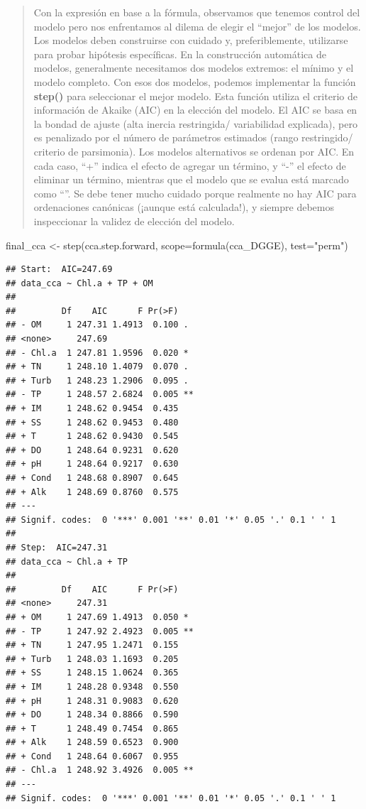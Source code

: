 \documentclass[
]{book}
\newenvironment{Shaded}{\begin{snugshade}}{\end{snugshade}}
\newcommand{\AttributeTok}[1]{\textcolor[rgb]{0.77,0.63,0.00}{#1}}
\newcommand{\FunctionTok}[1]{\textcolor[rgb]{0.00,0.00,0.00}{#1}}
\newcommand{\NormalTok}[1]{#1}
\newcommand{\OtherTok}[1]{\textcolor[rgb]{0.56,0.35,0.01}{#1}}
\newcommand{\StringTok}[1]{\textcolor[rgb]{0.31,0.60,0.02}{#1}}
\begin{document}
\begin{quote}
Con la expresión en base a la fórmula, observamos que tenemos control del modelo pero nos enfrentamos al dilema de elegir el ``mejor'' de los modelos.
Los modelos deben construirse con cuidado y, preferiblemente, utilizarse para probar
hipótesis específicas. En la construcción automática de modelos, generalmente necesitamos dos modelos extremos: el mínimo y el modelo completo. Con esos dos modelos, podemos implementar la función \textbf{step()} para seleccionar el mejor modelo. Esta función utiliza el criterio de información de Akaike (AIC) en la elección del modelo. El AIC se basa en la bondad de ajuste (alta inercia restringida/ variabilidad explicada), pero es penalizado por el número de parámetros estimados (rango restringido/ criterio de parsimonia). Los modelos alternativos se ordenan por AIC. En cada caso, ``+'' indica el efecto de agregar un término, y ``-'' el efecto de eliminar un término, mientras que el modelo que se evalua está marcado como ``''. Se debe tener mucho cuidado porque realmente no hay AIC para ordenaciones canónicas (¡aunque está calculada!), y siempre debemos inspeccionar la validez de elección del modelo.
\end{quote}

\begin{Shaded}
\begin{Highlighting}[]
\NormalTok{final\_cca }\OtherTok{\textless{}{-}} \FunctionTok{step}\NormalTok{(cca.step.forward, }\AttributeTok{scope=}\FunctionTok{formula}\NormalTok{(cca\_DGGE), }\AttributeTok{test=}\StringTok{"perm"}\NormalTok{)}
\end{Highlighting}
\end{Shaded}

\begin{verbatim}
## Start:  AIC=247.69
## data_cca ~ Chl.a + TP + OM
## 
##         Df    AIC      F Pr(>F)   
## - OM     1 247.31 1.4913  0.100 . 
## <none>     247.69                 
## - Chl.a  1 247.81 1.9596  0.020 * 
## + TN     1 248.10 1.4079  0.070 . 
## + Turb   1 248.23 1.2906  0.095 . 
## - TP     1 248.57 2.6824  0.005 **
## + IM     1 248.62 0.9454  0.435   
## + SS     1 248.62 0.9453  0.480   
## + T      1 248.62 0.9430  0.545   
## + DO     1 248.64 0.9231  0.620   
## + pH     1 248.64 0.9217  0.630   
## + Cond   1 248.68 0.8907  0.645   
## + Alk    1 248.69 0.8760  0.575   
## ---
## Signif. codes:  0 '***' 0.001 '**' 0.01 '*' 0.05 '.' 0.1 ' ' 1
## 
## Step:  AIC=247.31
## data_cca ~ Chl.a + TP
## 
##         Df    AIC      F Pr(>F)   
## <none>     247.31                 
## + OM     1 247.69 1.4913  0.050 * 
## - TP     1 247.92 2.4923  0.005 **
## + TN     1 247.95 1.2471  0.155   
## + Turb   1 248.03 1.1693  0.205   
## + SS     1 248.15 1.0624  0.365   
## + IM     1 248.28 0.9348  0.550   
## + pH     1 248.31 0.9083  0.620   
## + DO     1 248.34 0.8866  0.590   
## + T      1 248.49 0.7454  0.865   
## + Alk    1 248.59 0.6523  0.900   
## + Cond   1 248.64 0.6067  0.955   
## - Chl.a  1 248.92 3.4926  0.005 **
## ---
## Signif. codes:  0 '***' 0.001 '**' 0.01 '*' 0.05 '.' 0.1 ' ' 1
\end{verbatim}
\end{document}
